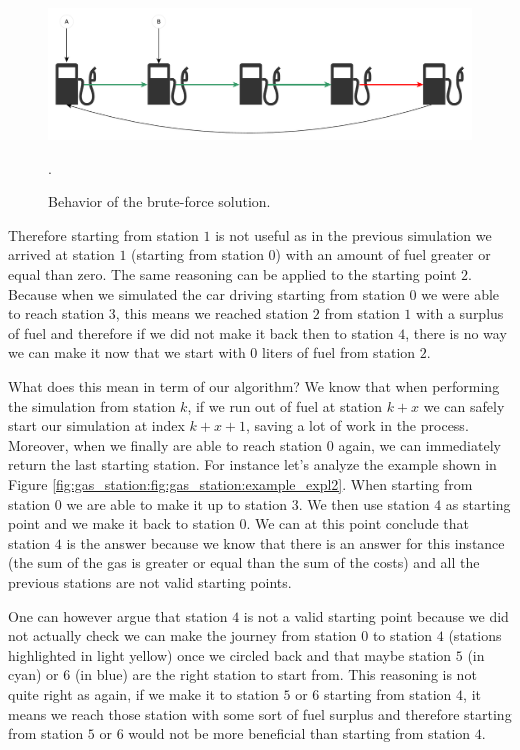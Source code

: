 \begin{figure}
	\centering
	\includegraphics[width=\textwidth]{sources/gas_station/images/example_expl1}
	\caption[]{Behavior of the brute-force solution.}.
	\label{fig:gas_station:fig:gas_station:example_expl1}
\end{figure}

Therefore starting from station $1$ is not useful as in the previous simulation we arrived at station $1$ (starting from station $0$) with an amount of fuel greater or equal than zero. The same reasoning can be applied to the starting point $2$. Because when we simulated the car driving starting from station $0$ we were able to reach station $3$, this means we reached station $2$ from station $1$ with a surplus of fuel and therefore if we did not make it back then to station $4$, there is no way we can make it now that we start with $0$ liters of fuel from station $2$.

What does this mean in term of our algorithm? We know that when performing the simulation from station $k$, if we run out of fuel at station $k+x$ we can safely start our simulation at index $k+x+1$, saving a lot of work in the process. 
Moreover, when we finally are able to reach station $0$ again, we can immediately return the last starting station. 
For instance let's analyze the example shown in Figure \ref{fig:gas_station:fig:gas_station:example_expl2}. When starting from station $0$ we are able to make it up to station $3$. We then use station $4$ as starting point and we make it back to station $0$. We can at this point conclude that station $4$ is the answer because we know that there is an answer for this instance (the sum of the gas is greater or equal than the sum of the costs) and all the previous stations are not valid starting points. 

One can however argue that station $4$ is not a valid starting point because we did not actually check we can make the journey from station $0$ to station $4$ (stations highlighted in light yellow) once we circled back and that maybe station $5$ (in cyan) or $6$ (in blue) are the right station to start from.
This reasoning is not quite right as again, if we make it to station $5$ or $6$ starting from station $4$, it means we reach those station with some sort of fuel surplus and therefore starting from station $5$ or $6$ would not be more beneficial than starting from station $4$.


